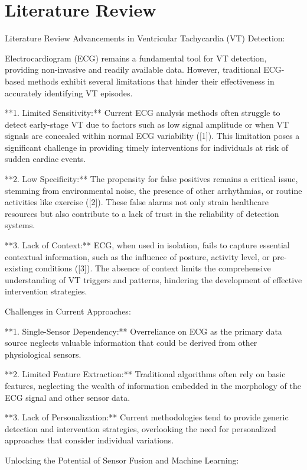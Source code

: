 \section{Literature Review}
Literature Review
Advancements in Ventricular Tachycardia (VT) Detection:

Electrocardiogram (ECG) remains a fundamental tool for VT detection, providing non-invasive and readily available data. However, traditional ECG-based methods exhibit several limitations that hinder their effectiveness in accurately identifying VT episodes.

**1. Limited Sensitivity:** Current ECG analysis methods often struggle to detect early-stage VT due to factors such as low signal amplitude or when VT signals are concealed within normal ECG variability ([1]). This limitation poses a significant challenge in providing timely interventions for individuals at risk of sudden cardiac events.

**2. Low Specificity:** The propensity for false positives remains a critical issue, stemming from environmental noise, the presence of other arrhythmias, or routine activities like exercise ([2]). These false alarms not only strain healthcare resources but also contribute to a lack of trust in the reliability of detection systems.

**3. Lack of Context:** ECG, when used in isolation, fails to capture essential contextual information, such as the influence of posture, activity level, or pre-existing conditions ([3]). The absence of context limits the comprehensive understanding of VT triggers and patterns, hindering the development of effective intervention strategies.

Challenges in Current Approaches:

**1. Single-Sensor Dependency:** Overreliance on ECG as the primary data source neglects valuable information that could be derived from other physiological sensors.

**2. Limited Feature Extraction:** Traditional algorithms often rely on basic features, neglecting the wealth of information embedded in the morphology of the ECG signal and other sensor data.

**3. Lack of Personalization:** Current methodologies tend to provide generic detection and intervention strategies, overlooking the need for personalized approaches that consider individual variations.

Unlocking the Potential of Sensor Fusion and Machine Learning:

